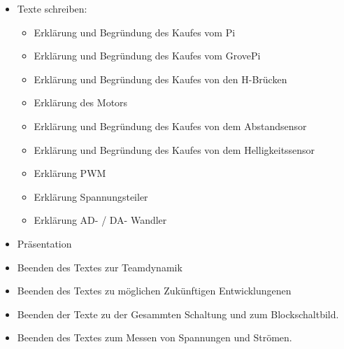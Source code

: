 \documentclass{article}
\begin{document}
\begin{itemize}

\item Texte schreiben:
\begin{itemize}

\item Erklärung und Begründung des Kaufes vom Pi

\item Erklärung und Begründung des Kaufes vom GrovePi

\item Erklärung und Begründung des Kaufes von den H-Brücken

\item Erklärung des Motors

\item Erklärung und Begründung des Kaufes von dem Abstandsensor

\item Erklärung und Begründung des Kaufes von dem Helligkeitssensor

\item Erklärung PWM

\item Erklärung Spannungsteiler

\item Erklärung AD- / DA- Wandler

\end{itemize}

\item Präsentation

\item Beenden des Textes zur Teamdynamik

\item Beenden des Textes zu möglichen Zukünftigen Entwicklungenen 

\item Beenden der Texte zu der Gesammten Schaltung und zum Blockschaltbild.

\item Beenden des Textes zum Messen von Spannungen und Strömen.

\end{itemize}
\end{document}

